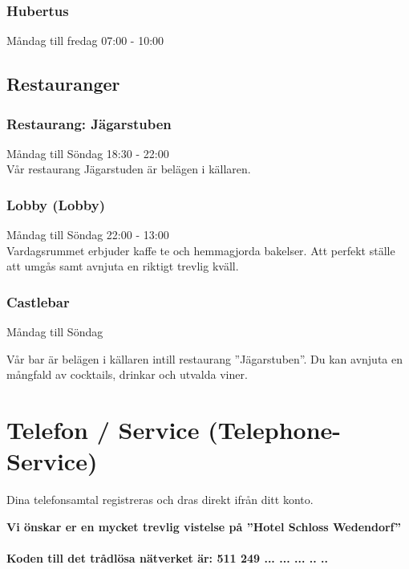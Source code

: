 \documentclass{report}
\begin{document}
\subsection{Hubertus}
Måndag till fredag 07:00 - 10:00

\section{Restauranger}
\subsection{Restaurang: Jägarstuben}
Måndag till Söndag 18:30 - 22:00 \\
Vår restaurang Jägarstuden är belägen i källaren.

\subsection{Lobby (Lobby)}
Måndag till Söndag 22:00 - 13:00 \\
Vardagsrummet erbjuder kaffe te och hemmagjorda bakelser. Att perfekt ställe
att umgås samt avnjuta en riktigt trevlig kväll.

\subsection{Castlebar}
Måndag till Söndag

Vår bar är belägen i källaren intill restaurang ''Jägarstuben''. Du kan avnjuta en mångfald av cocktails, drinkar och utvalda viner.

\chapter{Telefon / Service (Telephone-Service)}
Dina telefonsamtal registreras och dras direkt ifrån ditt konto.

\newpage

\bf{Vi önskar er en mycket trevlig vistelse på ''Hotel Schloss Wedendorf''}
\\\\
\huge{Koden till det trådlösa nätverket är: 511 249 ... ... ... .. ..}
\end{document}

